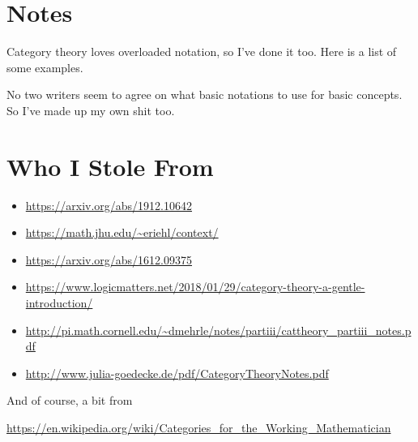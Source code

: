 \section{Notes}

Category theory loves overloaded notation, so I've done it too. Here is a list of some
examples.

No two writers seem to agree on what basic notations to use for basic concepts. So I've
made up my own shit too.

\section{Who I Stole From}

\small
\begin{itemize}
\item \url{https://arxiv.org/abs/1912.10642}

\item \url{https://math.jhu.edu/~eriehl/context/}

\item \url{https://arxiv.org/abs/1612.09375}

\item \url{https://www.logicmatters.net/2018/01/29/category-theory-a-gentle-introduction/}

\item \url{http://pi.math.cornell.edu/~dmehrle/notes/partiii/cattheory_partiii_notes.pdf}

\item \url{http://www.julia-goedecke.de/pdf/CategoryTheoryNotes.pdf}

\end{itemize}

And of course, a bit from

\url{https://en.wikipedia.org/wiki/Categories_for_the_Working_Mathematician}